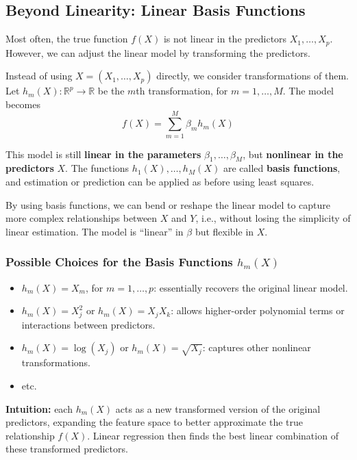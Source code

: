 \documentclass[
  letterpaper,
  DIV=11,
  numbers=noendperiod]{scrartcl}
\providecommand{\tightlist}{%
  \setlength{\itemsep}{0pt}\setlength{\parskip}{0pt}}\usepackage{longtable,booktabs,array}
\begin{document}
\subsection{Beyond Linearity: Linear Basis
Functions}\label{beyond-linearity-linear-basis-functions}

Most often, the true function \(f(X)\) is not linear in the predictors
\(X_1, \ldots, X_p\). However, we can adjust the linear model by
transforming the predictors.

Instead of using \(X = (X_1, \ldots, X_p)\) directly, we consider
transformations of them. Let
\(h_m(X): \mathbb{R}^p \rightarrow \mathbb{R}\) be the \(m\)th
transformation, for \(m = 1, \ldots, M\). The model becomes
\[f(X) = \sum_{m=1}^{M} \beta_m h_m(X)\]

This model is still \textbf{linear in the parameters}
\(\beta_1, \ldots, \beta_M\), but \textbf{nonlinear in the predictors}
\(X\). The functions \(h_1(X), \ldots, h_M(X)\) are called \textbf{basis
functions}, and estimation or prediction can be applied as before using
least squares.

By using basis functions, we can bend or reshape the linear model to
capture more complex relationships between \(X\) and \(Y\), i.e.,
without losing the simplicity of linear estimation. The model is
``linear'' in \(\beta\) but flexible in \(X\).

\subsubsection{\texorpdfstring{Possible Choices for the Basis Functions
\(h_m(X)\)}{Possible Choices for the Basis Functions h\_m(X)}}\label{possible-choices-for-the-basis-functions-h_mx}

\begin{itemize}
\tightlist
\item
  \(h_m(X) = X_m\), for \(m = 1, \ldots, p\): essentially recovers the
  original linear model.
\item
  \(h_m(X) = X_j^2\) or \(h_m(X) = X_j X_k\): allows higher-order
  polynomial terms or interactions between predictors.
\item
  \(h_m(X) = \log(X_j)\) or \(h_m(X) = \sqrt{X_j}\): captures other
  nonlinear transformations.
\item
  etc.
\end{itemize}

\textbf{Intuition:} each \(h_m(X)\) acts as a new transformed version of
the original predictors, expanding the feature space to better
approximate the true relationship \(f(X)\). Linear regression then finds
the best linear combination of these transformed predictors.
\end{document}
